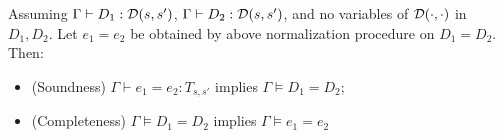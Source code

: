 \begin{theorem}
  Assuming $\Gamma\vdash D_1 : {\mathcal{D}}(s,s')$, $\Gamma\vdash D_2 : {\mathcal{D}}(s,s')$, 
  and no variables of $\mathcal{D}(\cdot,\cdot)$ in $D_1,D_2$.
  Let $e_1 = e_2$ be obtained by above normalization procedure on $D_1 = D_2$. Then:
  \begin{itemize}
    \item (Soundness) $\Gamma\vdash e_1 = e_2 : T_{s,s'}$ implies $\Gamma\vDash D_1 = D_2$;
    \item (Completeness) $\Gamma\vDash D_1 = D_2$ implies $\Gamma\vDash e_1 = e_2$
  \end{itemize}
\end{theorem}


